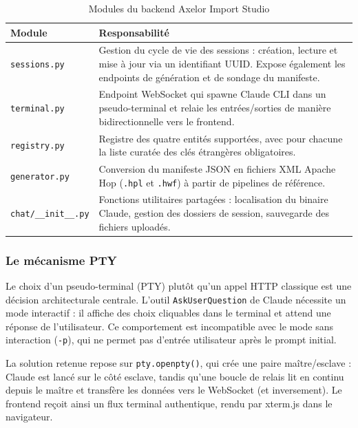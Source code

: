 \begin{table}[H]
  \centering
  \renewcommand{\arraystretch}{1.4}
  \begin{tabular}{p{3.5cm} p{9cm}}
    \toprule
    \rowcolor{gray!20}
    \textbf{Module} & \textbf{Responsabilité} \\
    \midrule
    \rowcolor{gray!5}
    \texttt{sessions.py}      & Gestion du cycle de vie des sessions : création, lecture et mise à jour via un identifiant UUID. Expose également les endpoints de génération et de sondage du manifeste. \\
    \texttt{terminal.py}      & Endpoint WebSocket qui spawne Claude CLI dans un pseudo-terminal et relaie les entrées/sorties de manière bidirectionnelle vers le frontend. \\
    \rowcolor{gray!5}
    \texttt{registry.py}      & Registre des quatre entités supportées, avec pour chacune la liste curatée des clés étrangères obligatoires. \\
    \texttt{generator.py}     & Conversion du manifeste JSON en fichiers XML Apache Hop (\texttt{.hpl} et \texttt{.hwf}) à partir de pipelines de référence. \\
    \rowcolor{gray!5}
    \texttt{chat/\_\_init\_\_.py} & Fonctions utilitaires partagées : localisation du binaire Claude, gestion des dossiers de session, sauvegarde des fichiers uploadés. \\
    \bottomrule
  \end{tabular}
  \caption{Modules du backend Axelor Import Studio}
  \label{tab:backend-modules}
\end{table}

\subsubsection{Le mécanisme PTY}

Le choix d'un pseudo-terminal (PTY) plutôt qu'un appel HTTP classique est une décision architecturale centrale. L'outil \texttt{AskUserQuestion} de Claude nécessite un mode interactif : il affiche des choix cliquables dans le terminal et attend une réponse de l'utilisateur. Ce comportement est incompatible avec le mode sans interaction (\texttt{-p}), qui ne permet pas d'entrée utilisateur après le prompt initial.

La solution retenue repose sur \texttt{pty.openpty()}, qui crée une paire maître/esclave : Claude est lancé sur le côté esclave, tandis qu'une boucle de relais lit en continu depuis le maître et transfère les données vers le WebSocket (et inversement). Le frontend reçoit ainsi un flux terminal authentique, rendu par xterm.js dans le navigateur.

